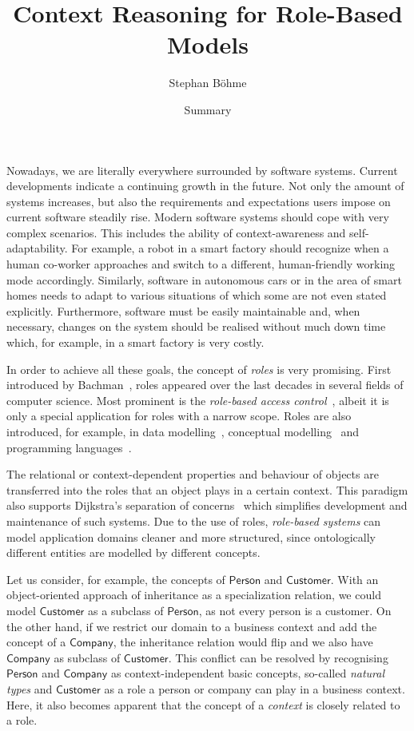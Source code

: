 \documentclass[final]{scrartcl}
\title{Context Reasoning for Role-Based Models}
\author{Stephan Böhme}
\date{Summary}
\begin{document}
\maketitle

\noindent
Nowadays, we are literally everywhere surrounded by software systems. Current developments indicate
a continuing growth in the future.  Not only the amount of systems increases, but also the
requirements and expectations users impose on current software steadily rise. Modern software
systems should cope with very complex scenarios. This includes the ability of context-awareness and
self-adaptability. For example, a robot in a smart factory should recognize when a human co-worker
approaches and switch to a different, human-friendly working mode accordingly. Similarly, software
in autonomous cars or in the area of smart homes needs to adapt to various situations of which some
are not even stated explicitly.
%
Furthermore, software must be easily maintainable and, when necessary, changes on the system should
be realised without much down time which, for example, in a smart factory is very costly.


In order to achieve all these goals, the concept of \emph{roles} is very promising. First introduced
by Bachman~\cite{BaD-VLDB77}, roles appeared over the last decades in several fields of computer
science. Most prominent is the \emph{role-based access
  control}~\cite{FeKC-RBAC03,AlFe-ECS11,SaCF-IEEE96}, albeit it is only a special application for
roles with a narrow scope. Roles are also introduced, for example, in data
modelling~\cite{Ha-ORM2006}, conceptual modelling~\cite{Stei-DKE00,Gui-PHD05,Stei-AO07} and
programming languages~\cite{BaBT-SAC06,Herr-AO07,BaGE-ECOOP07}.

The relational or context-dependent properties and behaviour of objects are transferred into the
roles that an object plays in a certain context. This paradigm also supports Dijkstra's separation of
concerns~\cite{Dij-SelWrCom82} which simplifies development and maintenance of such systems.  Due to
the use of roles, \emph{role-based systems} can model application domains cleaner and more
structured, since ontologically different entities are modelled by different concepts.

Let us consider, for example, the concepts of $\mathsf{Person}$ and $\mathsf{Customer}$. With an
object-oriented approach of inheritance as a specialization relation, we could model
$\mathsf{Customer}$ as a subclass of $\mathsf{Person}$, as not every person is a customer.
On the other hand, if we restrict our domain to a business context and add the concept of a
$\mathsf{Company}$, the inheritance relation would flip and we also have $\mathsf{Company}$ as
subclass of $\mathsf{Customer}$.  This conflict can be resolved by recognising
$\mathsf{Person}$ and $\mathsf{Company}$ as context-independent basic concepts, so-called
\emph{natural types} and $\mathsf{Customer}$ as a role a person or company can play in a
business context. Here, it also becomes apparent that the concept of a \emph{context} is closely
related to a role.
\end{document}
